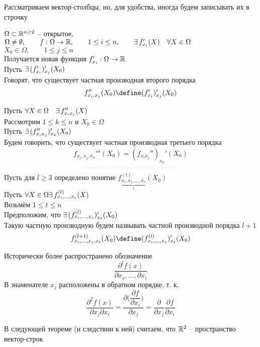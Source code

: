 Рассматриваем вектор-столбцы, но, для удобства, иногда будем записывать их в строчку

\begin{definition}
	$ \Omega \subset \mathbb{R}^{n \ge 2} $ -- открытое, $ \Omega \ne \emptyset, \qquad f : \Omega \to \mathbb{R}, \qquad 1 \le i \le n, \qquad \exists\, f_{x_i}'(X) \quad \forall X \in \Omega $ \\
	$ X_0 \in \Omega, \qquad 1 \le j \le n $ \\
	Получается новая функция $ f_{x_i}' : \Omega \to \mathbb{R} $ \\
	Пусть $ \exists\, (f_{x_i}')_{x_j}'(X_0) $ \\
	Говорят, что существует частная производная второго порядка
	$$ f_{x_i,x_j}''(X_0) \define (f_{x_i}')_{x_j}'(X_0) $$
\end{definition}

\begin{definition}
	Пусть $ \forall X \in \Omega \quad \exists\, f_{x_ix_j}''(X) $ \\
	Рассмотрим $ 1 \le k \le n $ и $ X_0 \in \Omega $ \\
	Пусть $ \exists\, (f_{x_ix_j}'')_{x_k}'(X_0) $ \\
	Будем говорить, что существует частная производная третьего порядка
	$$ f_{x_i,x_j,x_k}'''(X_0) = (f_{x_ix_j}'')_{x_k}'(X_0) $$
	$$ \widedots $$
	Пусть для $ l \ge 3 $ определено понятие $ f_{\underbrace{x_i, x_j, ..., x_s}_l}^{(l)}(X_0) $ \\
	Пусть $ \forall X \in \Omega \exists\, f_{x_i, ..., x_s}^{(l)}(X) $ \\
	Возьмём $ 1 \le t \le n $ \\
	Предположим, что $ \exists\, (f_{x_i, ..., x_s}^{(l)})_{x_t}'(X_0) $ \\
	Такую частную производную будем назвывать частной производной порядка $ l + 1 $
	$$ f_{x_i, ..., x_s, x_t}^{(l + 1)}(X_0) \define (f_{x_i, ..., x_s}^{(l)})_{x_t}'(X_0) $$
\end{definition}

\begin{notation}
	Исторически более распространено обозначение
	$$ \frac{\partial^l f(x)}{\partial x_s, ..., \partial x_i} $$
	В знаменателе $ x_j $ расположены в обратном порядке, т. к.
	$$ \frac{\partial^2f(x)}{\partial x_j \partial x_i} = \frac{\partial \bigg( \dfrac{\partial f}{\partial x_i} \bigg)}{\partial x_j} = \frac\partial{\partial x_j} \frac{\partial f}{\partial x_i} $$
\end{notation}

В следующей теореме (и следствии к ней) считаем, что $ \mathbb{R}^2 $ -- пространство вектор-строк

